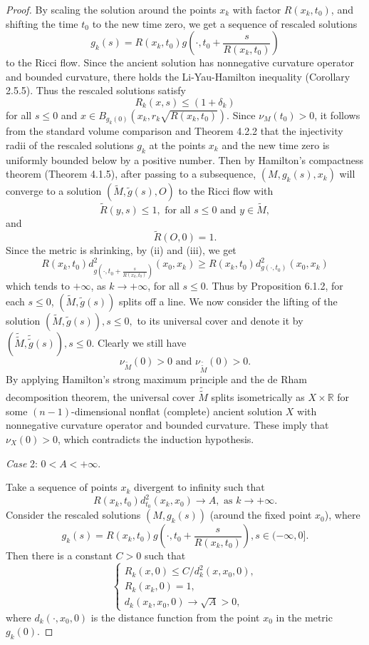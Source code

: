\begin{proof}
By scaling the solution around the points $x_k$ with factor
$R(x_k,t_0)$, and shifting the time $t_0$ to the new time zero, we
get a sequence of rescaled solutions
$$
{g}_k(s) = R(x_k,t_0)g\left(\cdot,t_0 + \frac{s}{R(x_k,t_0)}\right)
$$
to the Ricci flow. Since the ancient solution has nonnegative
curvature operator and bounded curvature, there holds the
Li-Yau-Hamilton inequality (Corollary 2.5.5). Thus the rescaled
solutions satisfy
$$
{R}_k(x,s) \leq (1+\delta_k)
$$
for all $s\leq 0$ and $x\in
B_{{g}_k(0)}(x_k,r_k\sqrt{R(x_k,t_0)}).$ Since $\nu_{M}(t_0)
> 0$, it follows from the standard volume comparison and Theorem
4.2.2 that the injectivity radii of the rescaled solutions ${g}_k$
at the points $x_k$ and the new time zero is uniformly bounded
below by a positive number. Then by Hamilton's compactness theorem
(Theorem 4.1.5), after passing to a subsequence,
$(M,{g}_k(s),x_k)$ will converge to a solution
$(\tilde{M},\tilde{g}(s),O)$ to the Ricci flow with
$$
\tilde{R}(y,s) \leq 1, \mbox{ for all } s \leq 0 \mbox{ and } y\in
\tilde{M},
$$
and
$$
\tilde{R}(O,0) = 1.
$$
Since the metric is shrinking, by (ii) and (iii), we get
$$
R(x_k,t_0)d^2_{g(\cdot,t_0 + \frac{s}{R(x_k,t_0)})}(x_0,x_k) \geq
R(x_k,t_0)d^2_{g(\cdot,t_0)}(x_0,x_k)
$$
which tends to $+\infty$, as $k\rightarrow +\infty$, for all
$s\leq 0$. Thus by Proposition 6.1.2, for each $s\leq 0$,
$(\tilde{M},\tilde{g}(s))$ splits off a line. We now consider the
lifting of the solution $(\tilde{M},\tilde{g}(s)), s \leq 0,$ to
its universal cover and denote it by
$(\tilde{\tilde{M}},\tilde{\tilde{g}}(s)), s \leq 0.$ Clearly we
still have
$$
\nu_{\tilde{M}}(0) > 0 \mbox{ and }\nu_{\tilde{\tilde{M}}}(0) > 0.
$$
By applying Hamilton's strong maximum principle and the de Rham
decomposition theorem, the universal cover $\tilde{\tilde{M}}$
splits isometrically as $X \times \mathbb{R}$ for some
$(n-1)$-dimensional nonflat (complete) ancient solution $X$ with
nonnegative curvature operator and bounded curvature. These imply
that $\nu_X(0) > 0$, which contradicts the induction hypothesis.

\medskip
{\it Case} 2: $0 < A < +\infty$.

\smallskip
Take a sequence of points $x_k$ divergent to infinity such that
$$
R(x_k,t_0)d^2_{t_0}(x_k,x_0) \rightarrow A,  \mbox{ as } k
\rightarrow +\infty.
$$
Consider the rescaled solutions $(M,g_k(s))$ (around the fixed
point $x_0$), where
$$
g_k(s) = R(x_k,t_0)g\left(\cdot,t_0 + \frac{s}{R(x_k,t_0)}\right), s\in
(-\infty,0].
$$
Then there is a constant $C > 0$ such that \begin{equation}
   \left\{
   \begin{array}{lll}
    R_k(x,0) \leq {C}/{d^2_k(x,x_0,0)},
         \\[2mm]
    R_k(x_k,0) = 1,
         \\[2mm]
    d_k(x_k,x_0,0) \rightarrow \sqrt{A} >0,
\end{array}
\right.%
\end{equation} where $d_k(\cdot,x_0,0)$ is the distance function from the
point $x_0$ in the metric $g_k(0)$.


\end{proof}
